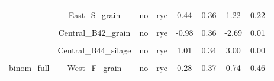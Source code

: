 \documentclass[
]{article}
\begin{document}
\begin{table}[H]
\begin{tabular}[t]{cccccccc}
\cellcolor{gray!6}{binom\_out-rm} & \cellcolor{gray!6}{Central\_B44\_silage} & \cellcolor{gray!6}{no} & \cellcolor{gray!6}{rye} & \cellcolor{gray!6}{1.01} & \cellcolor{gray!6}{0.31} & \cellcolor{gray!6}{3.24} & \cellcolor{gray!6}{0.00}\\
 & East\_S\_grain & no & rye & 0.44 & 0.36 & 1.22 & 0.22\\

\cellcolor{gray!6}{binom\_out-rm} & \cellcolor{gray!6}{West\_F\_grain} & \cellcolor{gray!6}{no} & \cellcolor{gray!6}{rye} & \cellcolor{gray!6}{0.71} & \cellcolor{gray!6}{0.37} & \cellcolor{gray!6}{1.89} & \cellcolor{gray!6}{0.06}\\
 & Central\_B42\_grain & no & rye & -0.98 & 0.36 & -2.69 & 0.01\\

\cellcolor{gray!6}{binom\_full} & \cellcolor{gray!6}{Central\_B44\_grain} & \cellcolor{gray!6}{no} & \cellcolor{gray!6}{rye} & \cellcolor{gray!6}{0.24} & \cellcolor{gray!6}{0.35} & \cellcolor{gray!6}{0.70} & \cellcolor{gray!6}{0.49}\\
 & Central\_B44\_silage & no & rye & 1.01 & 0.34 & 3.00 & 0.00\\

\cellcolor{gray!6}{binom\_full} & \cellcolor{gray!6}{East\_S\_grain} & \cellcolor{gray!6}{no} & \cellcolor{gray!6}{rye} & \cellcolor{gray!6}{0.44} & \cellcolor{gray!6}{0.39} & \cellcolor{gray!6}{1.14} & \cellcolor{gray!6}{0.26}\\
\multirow{-5}{*}{\centering\arraybackslash binom\_full} & West\_F\_grain & no & rye & 0.28 & 0.37 & 0.74 & 0.46\\
\bottomrule
\end{tabular}
\end{table}
\end{document}
